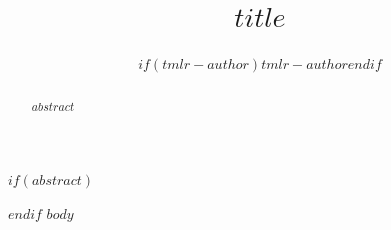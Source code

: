\documentclass[10pt]{article}
\title{$title$}
\author{$if(tmlr-author)$$tmlr-author$$endif$}
\begin{document}
\maketitle
$if(abstract)$
\begin{abstract}
$abstract$
\end{abstract}
$endif$
$body$
\end{document}

